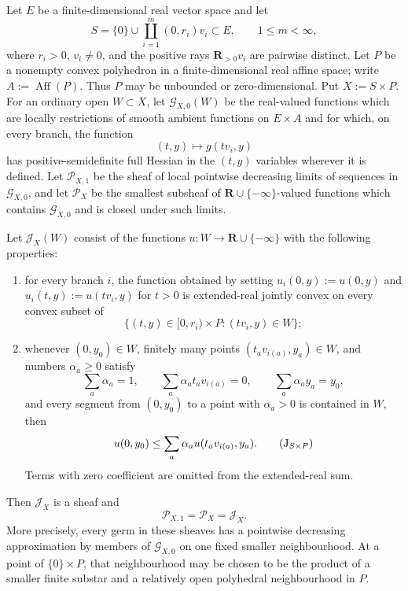\begin{theorem}
\label{thm:p071-finite-star-polyhedral-collapse}
Let \(E\) be a finite-dimensional real vector space and let
\[
 S=\{0\}\cup\coprod_{i=1}^{m}(0,r_i)v_i\subset E,
 \qquad 1\leq m<\infty,
\]
where \(r_i>0\), \(v_i\ne0\), and the positive rays
\(\mathbf R_{>0}v_i\) are pairwise distinct.  Let \(P\) be a nonempty
convex polyhedron in a finite-dimensional real affine space; write
\(A:=\operatorname{Aff}(P)\).  Thus \(P\) may be unbounded or
zero-dimensional.  Put \(X:=S\times P\).
For an ordinary open \(W\subset X\), let \(\mathcal G_{X,0}(W)\) be the
real-valued functions which are locally restrictions of smooth ambient
functions on \(E\times A\) and for which, on every branch, the function
\[
 (t,y)\longmapsto g(tv_i,y)
\]
has positive-semidefinite full Hessian in the \((t,y)\) variables wherever
it is defined.  Let \(\mathcal P_{X,1}\) be the sheaf of local pointwise
decreasing limits of sequences in \(\mathcal G_{X,0}\), and let
\(\mathcal P_X\) be the smallest subsheaf of
\(\mathbf R\cup\{-\infty\}\)-valued functions which contains
\(\mathcal G_{X,0}\) and is closed under such limits.

Let \(\mathcal J_X(W)\) consist of the functions
\(u:W\to\mathbf R\cup\{-\infty\}\) with the following properties:
\begin{enumerate}
\item for every branch \(i\), the function obtained by setting
      \(u_i(0,y):=u(0,y)\) and \(u_i(t,y):=u(tv_i,y)\) for \(t>0\)
      is extended-real jointly convex on every convex subset of
      \[
       \{(t,y)\in[0,r_i)\times P:(tv_i,y)\in W\};
      \]
\item whenever \((0,y_0)\in W\), finitely many points
      \((t_av_{i(a)},y_a)\in W\), and numbers \(\alpha_a\geq0\) satisfy
      \[
       \sum_a\alpha_a=1,
       \qquad
       \sum_a\alpha_at_av_{i(a)}=0,
       \qquad
       \sum_a\alpha_ay_a=y_0,
      \]
      and every segment from \((0,y_0)\) to a point with
      \(\alpha_a>0\) is contained in \(W\), then
      \[
       u(0,y_0)\leq\sum_a\alpha_a u(t_av_{i(a)},y_a).
       \tag{\(\mathrm J_{S\times P}\)}
      \]
      Terms with zero coefficient are omitted from the extended-real sum.
\end{enumerate}
Then \(\mathcal J_X\) is a sheaf and
\[
                       \mathcal P_{X,1}=\mathcal P_X=\mathcal J_X.
\]
More precisely, every germ in these sheaves has a pointwise decreasing
approximation by members of \(\mathcal G_{X,0}\) on one fixed smaller
neighbourhood.  At a point of \(\{0\}\times P\), that neighbourhood may
be chosen to be the product of a smaller finite substar and a relatively
open polyhedral neighbourhood in \(P\).
\end{theorem}
